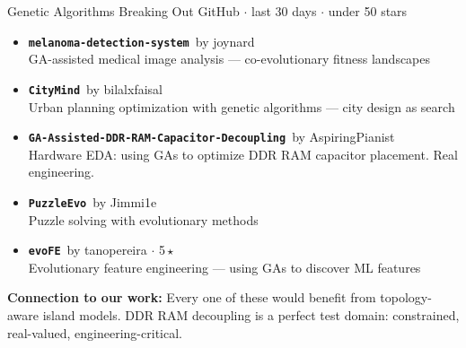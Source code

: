 \documentclass[aspectratio=169,14pt]{beamer}
\newcommand{\repo}[2]{\texttt{\color{geccoAccent}\bfseries #1}{\color{dimGray}\scriptsize\ by #2}}
\newcommand{\repoHL}[2]{\texttt{\color{geccoHighlight}\bfseries #1}{\color{dimGray}\scriptsize\ by #2}}
\newcommand{\repoGR}[2]{\texttt{\color{geccoGreen}\bfseries #1}{\color{dimGray}\scriptsize\ by #2}}
\newcommand{\bscore}[1]{{\color{geccoAccent}\bfseries #1}}
\newcommand{\connection}[1]{%
  \vspace{4pt}
  {\small\color{geccoHighlight}\textbf{Connection to our work:} \color{white}#1}}
\begin{document}
\begin{frame}{Genetic Algorithms Breaking Out}
  {\small\color{dimGray} GitHub $\cdot$ last 30 days $\cdot$ under 50 stars}
  \vspace{6pt}

  \begin{itemize}
    \item[\bscore{1.2}] \repo{melanoma-detection-system}{joynard}\\
      {\small GA-assisted medical image analysis --- co-evolutionary fitness landscapes}
    \vspace{3pt}
    \item[\bscore{0.4}] \repo{CityMind}{bilalxfaisal}\\
      {\small Urban planning optimization with genetic algorithms --- city design as search}
    \vspace{3pt}
    \item[\bscore{0.3}] \repoHL{GA-Assisted-DDR-RAM-Capacitor-Decoupling}{AspiringPianist}\\
      {\small Hardware EDA: using GAs to optimize DDR RAM capacitor placement. Real engineering.}
    \vspace{3pt}
    \item[\bscore{0.2}] \repo{PuzzleEvo}{Jimmi1e}\\
      {\small Puzzle solving with evolutionary methods}
    \vspace{3pt}
    \item[] \repoGR{evoFE}{tanopereira} {\small$\cdot$ 5\,\(\star\)}\\
      {\small Evolutionary feature engineering --- using GAs to discover ML features}
  \end{itemize}

  \vspace{2pt}
  \connection{Every one of these would benefit from topology-aware island models. DDR RAM decoupling is a perfect test domain: constrained, real-valued, engineering-critical.}
\end{frame}
\end{document}
